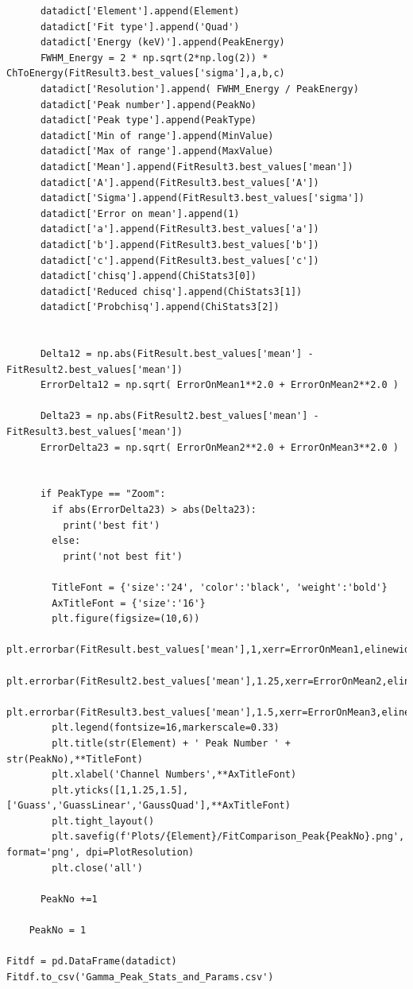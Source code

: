 \documentclass[11pt,a4paper]{article}
\begin{document}
\begin{verbatim}
      datadict['Element'].append(Element)
      datadict['Fit type'].append('Quad')
      datadict['Energy (keV)'].append(PeakEnergy)
      FWHM_Energy = 2 * np.sqrt(2*np.log(2)) * ChToEnergy(FitResult3.best_values['sigma'],a,b,c)
      datadict['Resolution'].append( FWHM_Energy / PeakEnergy)
      datadict['Peak number'].append(PeakNo)
      datadict['Peak type'].append(PeakType)
      datadict['Min of range'].append(MinValue)
      datadict['Max of range'].append(MaxValue)
      datadict['Mean'].append(FitResult3.best_values['mean'])
      datadict['A'].append(FitResult3.best_values['A'])
      datadict['Sigma'].append(FitResult3.best_values['sigma'])
      datadict['Error on mean'].append(1)
      datadict['a'].append(FitResult3.best_values['a'])
      datadict['b'].append(FitResult3.best_values['b'])
      datadict['c'].append(FitResult3.best_values['c'])
      datadict['chisq'].append(ChiStats3[0])
      datadict['Reduced chisq'].append(ChiStats3[1])
      datadict['Probchisq'].append(ChiStats3[2])
      

      Delta12 = np.abs(FitResult.best_values['mean'] - FitResult2.best_values['mean'])
      ErrorDelta12 = np.sqrt( ErrorOnMean1**2.0 + ErrorOnMean2**2.0 )

      Delta23 = np.abs(FitResult2.best_values['mean'] - FitResult3.best_values['mean'])
      ErrorDelta23 = np.sqrt( ErrorOnMean2**2.0 + ErrorOnMean3**2.0 )


      if PeakType == "Zoom":
        if abs(ErrorDelta23) > abs(Delta23):
          print('best fit')
        else:
          print('not best fit')
            
        TitleFont = {'size':'24', 'color':'black', 'weight':'bold'} 
        AxTitleFont = {'size':'16'}
        plt.figure(figsize=(10,6))
        plt.errorbar(FitResult.best_values['mean'],1,xerr=ErrorOnMean1,elinewidth=6,capsize=10,capthick=5,marker='o',markersize=20,label="Gauss")
        plt.errorbar(FitResult2.best_values['mean'],1.25,xerr=ErrorOnMean2,elinewidth=6,capsize=10,capthick=5,marker='o',markersize=20,label="GaussLinear")
        plt.errorbar(FitResult3.best_values['mean'],1.5,xerr=ErrorOnMean3,elinewidth=6,capsize=10,capthick=5,marker='o',markersize=20,label="GaussQuad")
        plt.legend(fontsize=16,markerscale=0.33)
        plt.title(str(Element) + ' Peak Number ' + str(PeakNo),**TitleFont)
        plt.xlabel('Channel Numbers',**AxTitleFont)
        plt.yticks([1,1.25,1.5],['Guass','GuassLinear','GaussQuad'],**AxTitleFont)
        plt.tight_layout()
        plt.savefig(f'Plots/{Element}/FitComparison_Peak{PeakNo}.png', format='png', dpi=PlotResolution)
        plt.close('all')
      
      PeakNo +=1

    PeakNo = 1

Fitdf = pd.DataFrame(datadict)
Fitdf.to_csv('Gamma_Peak_Stats_and_Params.csv')
\end{verbatim}
\end{document}
